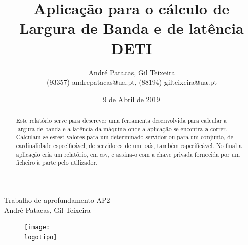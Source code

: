 \documentclass{report}
\begin{document}
%

\def\titulo{Trabalho de aprofundamento AP2}
\def\data{9 de Abril de 2019}
\def\autores{André Patacas, Gil Teixeira}
\def\autorescontactos{(93357) andrepatacas@ua.pt, (88194) gilteixeira@ua.pt}
\def\departamento{DETI}
\def\logotipo{ua.pdf}
%
%
\begin{titlepage}

\begin{center}
%
\vspace*{50mm}
%
{\Huge \titulo}\\ 
%
\vspace{10mm}
%
{\LARGE \autores}\\ 
%
\vspace{30mm}
%
\begin{figure}[h]
\center
\texttt{[image: \\logotipo]}
\end{figure}
%
\vspace{30mm}
\end{center}
%
\begin{flushright}

\end{flushright}
\end{titlepage}

\title{%
{\Huge\textbf{Aplicação para o cálculo de Largura de Banda e de latência}}\\
{\Large \departamento}
}
%
\author{%
    \autores \\
    \autorescontactos 
}

%
\date{\data}
%
\maketitle






\tableofcontents


\clearpage
{}

\begin{abstract}
Este relatório serve para descrever uma ferramenta desenvolvida para calcular a largura de banda e a latência da máquina onde a aplicação se encontra a correr. Calculam-se estest valores para um determinado servidor ou para um conjunto, de cardinalidade especificável, de servidores de um país, também especificável. No final a aplicação cria um relatõrio, em csv, e assina-o com a chave privada fornecida por um ficheiro à parte pelo utilizador.

\end{abstract}
\end{document}
